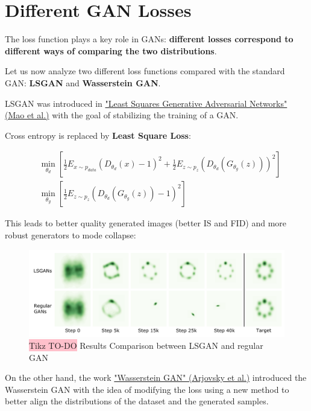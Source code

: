 \section{Different GAN Losses}

The loss function plays a key role in GANs: \textbf{different losses correspond to different ways of comparing the two distributions}.

Let us now analyze two different loss functions compared with the standard GAN: \textbf{LSGAN} and \textbf{Wasserstein GAN}.

LSGAN was introduced in \href{https://arxiv.org/pdf/1611.04076}{"Least Squares Generative Adversarial Networks" (Mao et al.)} with the goal of stabilizing the training of a GAN.

Cross entropy is replaced by \textbf{Least Square Loss}:

\vspace{-0.5cm}
{\Large
\begin{equation*}
\begin{aligned}
    &\min_{\theta_{d}} \left[\frac{1}{2}E_{x \sim p_{data}} \left(D_{\theta_{d}}(x) - 1\right)^2 + \frac{1}{2}E_{z \sim p_{z}} \left(D_{\theta_{d}}(G_{\theta_{g}}(z))\right)^2\right] \\
    &\min_{\theta_{g}} \left[\frac{1}{2}E_{z \sim p_{z}} \left(D_{\theta_{d}}(G_{\theta_{g}}(z)) - 1\right)^2\right]
\end{aligned}
\end{equation*}
}

This leads to better quality generated images (better IS and FID) and more robust generators to mode collapse:

\begin{figure}[!htbp]
    \centering
    \includegraphics[width=\linewidth]{tikz/chapter9 - LSGAN.png}
    \caption{{\color{red}\colorbox{pink}{Tikz TO-DO}} Results Comparison between LSGAN and regular GAN}
\end{figure}

On the other hand, the work \href{https://arxiv.org/pdf/1701.07875}{"Wasserstein GAN" (Arjovsky et al.)} introduced the Wasserstein GAN with the idea of modifying the loss using a new method to better align the distributions of the dataset and the generated samples.

